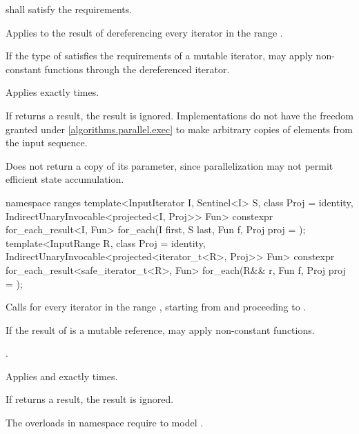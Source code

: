 \begin{itemdescr}
\pnum
\requires
{} shall satisfy the  requirements.

\pnum
\effects
Applies  to the result of dereferencing every iterator in the range
.
\begin{note}
If the type of  satisfies the requirements of a mutable iterator,
 may apply non-constant functions through the dereferenced iterator.
\end{note}

\pnum
\complexity
Applies  exactly  times.

\pnum
\remarks
If  returns a result, the result is ignored.
Implementations do not
have the freedom granted under \ref{algorithms.parallel.exec} to make arbitrary
copies of elements from the input sequence.

\pnum
\begin{note}
Does not return a copy of its  parameter, since
parallelization may not permit efficient state accumulation.
\end{note}
\end{itemdescr}

%
\begin{itemdecl}
namespace ranges {
  template<InputIterator I, Sentinel<I> S, class Proj = identity,
      IndirectUnaryInvocable<projected<I, Proj>> Fun>
    constexpr for_each_result<I, Fun>
      for_each(I first, S last, Fun f, Proj proj = {});
  template<InputRange R, class Proj = identity,
      IndirectUnaryInvocable<projected<iterator_t<R>, Proj>> Fun>
    constexpr for_each_result<safe_iterator_t<R>, Fun>
      for_each(R&& r, Fun f, Proj proj = {});
}
\end{itemdecl}

\begin{itemdescr}
\pnum
\effects
Calls
 for every iterator
 in the range
,
starting from
and proceeding to
.
\begin{note}
If the result of
 is a mutable reference,  may apply
non-constant functions.
\end{note}

\pnum
\returns
{}.

\pnum
\complexity
Applies  and 
exactly
times.

\pnum
\remarks
If  returns a result, the result is ignored.

\pnum
\begin{note}
The overloads in namespace  require  to model
.
\end{note}
\end{itemdescr}

